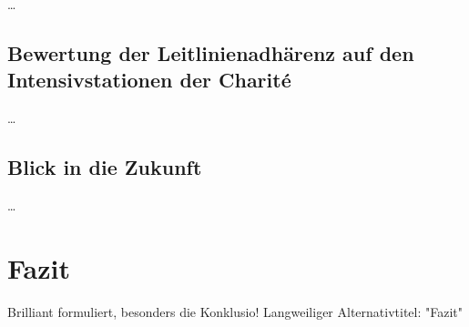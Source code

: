 \dots

\section{Bewertung der Leitlinienadhärenz auf den Intensivstationen der Charité}
\dots

\section{Blick in die Zukunft}
\dots

\chapter{Fazit}
Brilliant formuliert, besonders die Konklusio! Langweiliger Alternativtitel: "Fazit"


